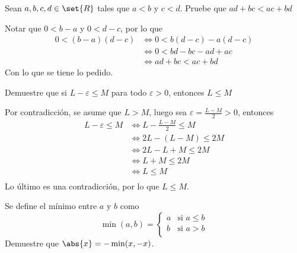 \documentclass{ayudantia}
\begin{document}
\begin{prob}
    Sean \(a,b,c,d\in\set{R}\) tales que \(a<b\) y \(c<d\). Pruebe que \(ad+bc<ac+bd\)
\end{prob}

\begin{ans}
    \begin{sol}
        Notar que \(0<b-a\) y \(0<d-c\), por lo que
        \begin{align*}
            0<(b-a)(d-c)&\iff 0<b(d-c)-a(d-c)\\
            &\iff 0<bd-bc-ad+ac\\
            &\iff ad+bc<ac+bd
        \end{align*}
        Con lo que se tiene lo pedido.
    \end{sol}
\end{ans}


\begin{prob}
    Demuestre que si \(L-\varepsilon\leq M\) para todo \(\varepsilon>0\), entonces \(L\leq M\)
\end{prob}

\begin{ans}
    \begin{sol}
        Por contradicción, se asume que \(L>M\), luego sea \(\varepsilon=\frac{L-M}2>0\), entonces
        \begin{align*}
            L-\varepsilon\leq M&\iff L-\frac{L-M}2\leq M\\
            &\iff 2L-(L-M)\leq 2M\\
            &\iff 2L-L+M\leq 2M\\
            &\iff L+M\leq 2M\\
            &\iff L\leq M\\
        \end{align*}
        Lo último es una contradicción, por lo que \(L\leq M\).
    \end{sol}
\end{ans}


\begin{prob}
    Se define el mínimo entre \(a\) y \(b\) como
    \begin{equation*}
        \min(a,b)=\begin{cases}
            a&\text{si }a\leq b\\
            b&\text{si }a>b\\
        \end{cases}
    \end{equation*}
    Demuestre que \(\abs{x}=-\min(x,-x)\).
\end{prob}
\end{document}
